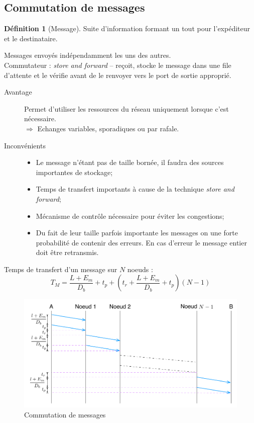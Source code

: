\documentclass[11pt,english,french]{scrreprt}
\theoremstyle{remark}
\theoremstyle{definition}
\newtheorem*{def*}{Définition}
\begin{document}
\subsection{Commutation de messages} %

\begin{def*}[Message]
	Suite d'information formant un tout pour l'expéditeur et le destinataire.
	
	Messages envoyés indépendamment les uns des autres.\\
	Commutateur : \emph{store and forward} -- reçoit, stocke le message dans une file d'attente et le vérifie avant de le renvoyer vers le port de sortie approprié.
\end{def*}

\begin{description}
	\item [Avantage] Permet d'utiliser les ressources du réseau uniquement lorsque c'est nécessaire.\\
	$\Rightarrow$ Echanges variables, sporadiques ou par rafale.
	\item[Inconvénients] \hfill \begin{itemize}
		\item Le message n'étant pas de taille bornée, il faudra des sources importantes de stockage;
		\item Temps de transfert importants à cause de la technique \emph{store and forward};
		\item Mécanisme de contrôle nécessaire pour éviter les congestions;
		\item Du fait de leur taille parfois importante les messages on une forte probabilité de contenir des erreurs. En cas d'erreur le message entier doit être retransmis.
		\end{itemize}
\end{description}

Temps de transfert d'un message sur $N$ noeuds :
\[
	T_{M}=\frac{L+E_{m}}{D_{b}}+t_{p}+\left(t_{r}+\frac{L+E_{m}}{D_{b}}+t_{p}\right)\left(N-1\right)
\]

\begin{figure}[h!]
	\center
	\includegraphics[scale=.75]{graphes/CM}
	\caption{Commutation de messages}
\end{figure}
\end{document}
